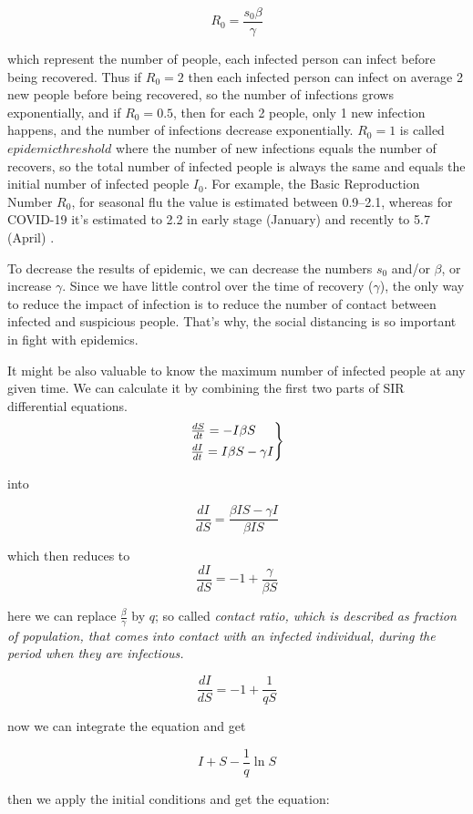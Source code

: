 \documentclass[nostrict]{szablonPG}
\begin{document}
\[ R_0 = \frac{s_0 \beta}{\gamma}\]

which represent the number of people, each infected person can infect before being recovered. Thus if $R_0 = 2$ then each infected person can infect on average 2 new people before being recovered, so the number of infections grows exponentially, and if $R_0 = 0.5$, then for each 2 people, only 1 new infection happens, and the number of infections decrease exponentially. $R_0 = 1$ is called $epidemic threshold$ where the number of new infections equals the number of recovers, so the total number of infected people is always the same and equals the initial number of infected people $I_0$. For example, the Basic Reproduction Number $R_0$, for seasonal flu the value is estimated between 0.9–2.1\cite{coburn2009modeling}, whereas for COVID-19 it's estimated to 2.2 in early stage (January) \cite{li2020early} and recently to 5.7 (April) \cite{readeid}.

To decrease the results of epidemic, we can decrease the numbers $s_0$ and/or $\beta$, or increase $\gamma$. Since we have little control over the time of recovery ($\gamma$), the only way to reduce the impact of infection is to reduce the number of contact between infected and suspicious people. That's why, the social distancing is so important in fight with epidemics.


It might be also valuable to know the maximum number of infected people at any given time. We can calculate it by combining the first two parts of SIR differential equations.
\[
\begin{rcases}
\frac{dS}{dt} = - I \beta S \\
\frac{dI}{dt} = I \beta S - \gamma I
\end{rcases}
\]

into 

\[\frac{dI}{dS} = \frac{\beta I S - \gamma I}{\beta I S}\]

which then reduces to 
\[\frac{dI}{dS} = -1 + \frac{\gamma}{\beta S}\]

here we can replace $\frac{\beta}{\gamma}$ by $q$; so called \it{contact ratio}, which is described as fraction of population, that comes into contact with an infected individual, during the period when they are infectious.

\[\frac{dI}{dS} = -1 + \frac{1}{q S}\]

now we can integrate the equation and get

\[I + S - \frac{1}{q} \ln{S}\]

then we apply the initial conditions and get the equation:
\end{document}
